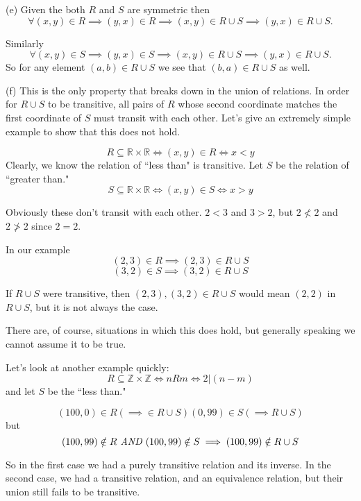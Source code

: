 \documentclass[16 pt]{amsart}
\theoremstyle{definition}
\theoremstyle{remark}
\numberwithin{equation}{section}
\newcommand{\R}{\mathbb{R}}
\newcommand{\Z}{\mathbb{Z}}
\begin{document}
\vspace{.5in}

(e) Given the both $R$ and $S$ are symmetric then 
\[
\forall (x,y)\in R \implies (y,x)\in R \implies (x,y)\in R\cup S \implies (y,x)\in R\cup S.
\]

Similarly 
\[
\forall (x,y)\in S \implies (y,x)\in S \implies (x,y)\in R\cup S \implies (y,x)\in R\cup S.
\]
So for any element $(a,b)\in R\cup S$ we see that $(b,a)\in R\cup S$ as well.


\vspace{.5in}

(f) This is the only property that breaks down in the union of relations.  In order for $R\cup S$ to be transitive, all pairs of $R$ whose second coordinate matches the first coordinate of $S$ must transit with each other.  Let's give an extremely simple example to show that this does not hold.

\[
R \subseteq \R\times \R \iff (x,y)\in R \iff x<y
\]
Clearly, we know the relation of ``less than" is transitive.
Let $S$ be the relation of ``greater than."
\[
S \subseteq \R\times \R \iff (x,y)\in S \iff x>y
\]

Obviously these don't transit with each other.
$2<3$ and $3>2$, but $2\nless 2$ and $2\ngtr 2$ since $2=2$.

In our example
\[
(2,3)\in R \implies (2,3)\in R\cup S
\]
\[
(3,2)\in S \implies (3,2)\in R\cup S
\]

If $R\cup S$ were transitive, then $(2,3),(3,2)\in R\cup S$ would mean $(2,2)$ in $R\cup S$, but it is not always the case.

There are, of course, situations in which this does hold, but generally speaking we cannot assume it to be true.

Let's look at another example quickly:
\[
R\subseteq \Z\times\Z \iff nRm \iff 2|(n-m)
\]
and let $S$ be the ``less than."

\[
(100,0)\in R (\implies \in R\cup S) (0,99)\in S(\implies R\cup S)
\]
but
\[
(100,99)\notin R \emph{ AND } (100,99)\notin S \implies (100,99)\notin R\cup S
\]

So in the first case we had a purely transitive relation and its inverse.  In the second case, we had a transitive relation, and an equivalence relation, but their union still fails to be transitive.
\end{document}
